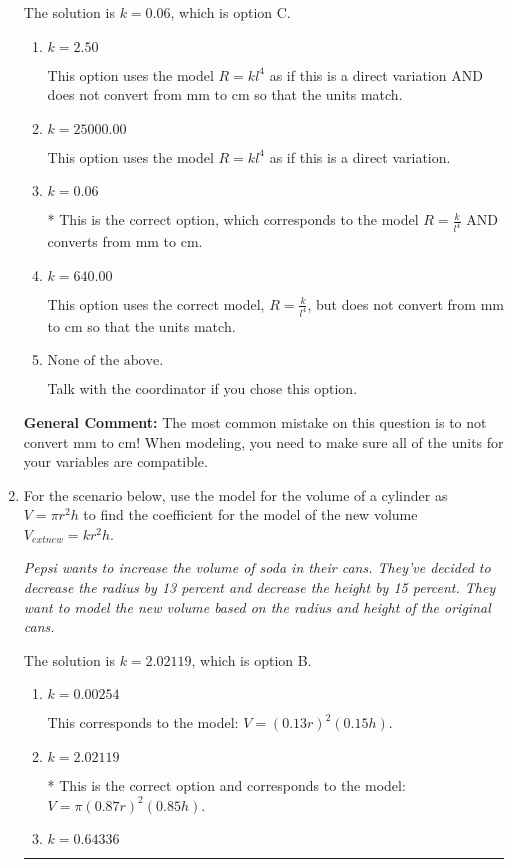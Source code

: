 \documentclass{extbook}[14pt]
\newcommand{\litem}[1]{\item #1

\rule{\textwidth}{0.4pt}}
\begin{document}
\begin{enumerate}
{The solution is \( k = 0.06 \), which is option C.\begin{enumerate}[label=\Alph*.]
\item \( k = 2.50 \)

This option uses the model $R = kl^{4}$ as if this is a direct variation AND does not convert from mm to cm so that the units match.
\item \( k = 25000.00 \)

This option uses the model $R = kl^{4}$ as if this is a direct variation.
\item \( k = 0.06 \)

* This is the correct option, which corresponds to the model $R = \frac{k}{l^{4}}$ AND converts from mm to cm.
\item \( k = 640.00 \)

This option uses the correct model, $R = \frac{k}{l^{4}}$, but does not convert from mm to cm so that the units match.
\item \( \text{None of the above.} \)

Talk with the coordinator if you chose this option.
\end{enumerate}

\textbf{General Comment:} The most common mistake on this question is to not convert mm to cm! When modeling, you need to make sure all of the units for your variables are compatible.
}
\litem{
For the scenario below, use the model for the volume of a cylinder as $V = \pi r^2 h$ to find the coefficient for the model of the new volume $V_{	ext{new}} = k r^2 h$.

\begin{center}
    \textit{ Pepsi wants to increase the volume of soda in their cans. They've decided to decrease the radius by 13 percent and decrease the height by 15 percent. They want to model the new volume based on the radius and height of the original cans. }
\end{center}


The solution is \( k = 2.02119 \), which is option B.\begin{enumerate}[label=\Alph*.]
\item \( k = 0.00254 \)

This corresponds to the model: $V = (0.13 r)^2 (0.15 h)$.
\item \( k = 2.02119 \)

* This is the correct option and corresponds to the model: $V = \pi (0.87 r)^2 (0.85 h)$.
\item \( k = 0.64336 \)


\end{enumerate}}
\end{enumerate}
\end{document}
